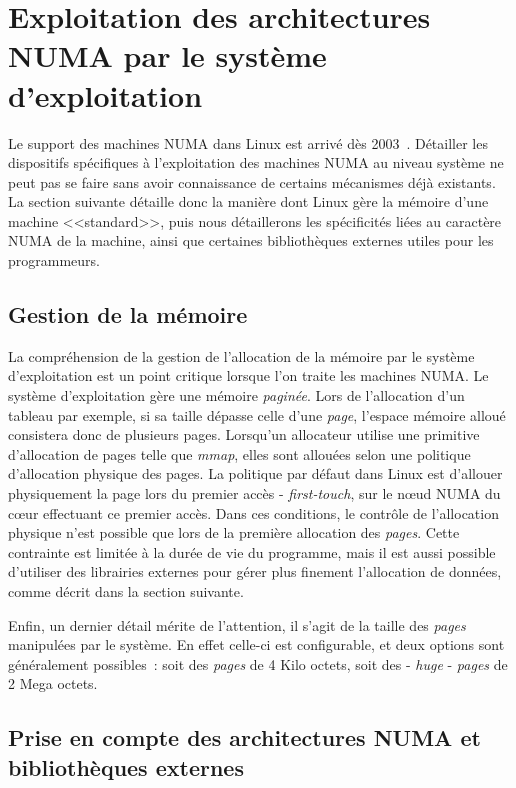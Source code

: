 \section{Exploitation des architectures NUMA par le système d'exploitation}\label{sec:context:os}

Le support des machines NUMA dans Linux est arrivé dès 2003~\cite{Dobson2003}.
Détailler les dispositifs spécifiques à l'exploitation des machines NUMA au niveau système ne peut pas se faire sans avoir connaissance de certains mécanismes déjà existants.
La section suivante détaille donc la manière dont Linux gère la mémoire d'une machine <<standard>>, puis nous détaillerons les spécificités liées au caractère NUMA de la machine, ainsi que certaines bibliothèques externes utiles pour les programmeurs.

\subsection{Gestion de la mémoire}

La compréhension de la gestion de l'allocation de la mémoire par le système d'exploitation est un point critique lorsque l'on traite les machines NUMA.
Le système d'exploitation gère une mémoire \emph{paginée}.
Lors de l'allocation d'un tableau par exemple, si sa taille dépasse celle d'une \emph{page}, l'espace mémoire alloué consistera donc de plusieurs pages.
Lorsqu'un allocateur utilise une primitive d'allocation de pages telle que \emph{mmap}, elles sont allouées selon une politique d'allocation physique des pages.
La politique par défaut dans Linux est d'allouer physiquement la page lors du premier accès - \emph{first-touch}, sur le nœud NUMA du cœur effectuant ce premier accès.
Dans ces conditions, le contrôle de l'allocation physique n'est possible que lors de la première allocation des \emph{pages}.
Cette contrainte est limitée à la durée de vie du programme, mais il est aussi possible d'utiliser des librairies externes pour gérer plus finement l'allocation de données, comme décrit dans la section suivante.

Enfin, un dernier détail mérite de l'attention, il s'agit de la taille des \emph{pages} manipulées par le système.
En effet celle-ci est configurable, et deux options sont généralement possibles~: soit des \emph{pages} de 4 Kilo octets, soit des - \emph{huge} - \emph{pages} de 2 Mega octets.

\subsection{Prise en compte des architectures NUMA et bibliothèques externes}\label{sec:context:os:lib}

